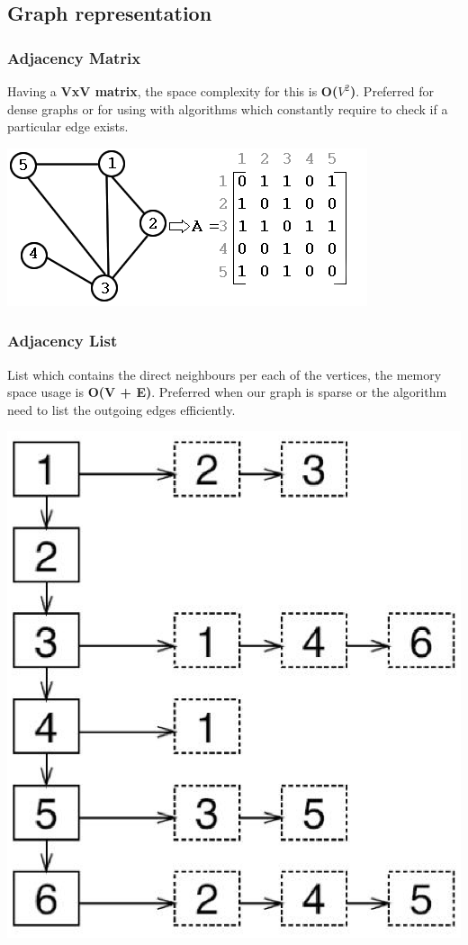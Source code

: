 \documentclass[article]{beamer}
\begin{document}
\subsection{Graph representation}
\begin{frame}
	\frametitle{Adjacency Matrix}
	Having a \textbf{VxV matrix}, the space complexity for this is \textbf{O($V^2$)}. Preferred for dense graphs or for using with algorithms which constantly require to check if a particular edge exists.
	\begin{center}
			\includegraphics[scale=0.6]{./figures/AdjacencyMatrix.png}
	\end{center}
\end{frame}

\begin{frame}
	\frametitle{Adjacency List}
	List which contains the direct neighbours per each of the vertices, the memory space usage is \textbf{O(V + E)}. Preferred when our graph is sparse or the algorithm need to list the outgoing edges efficiently. 
	\begin{center}
			\includegraphics[scale=0.4]{./figures/adjacency_list.eps}
	\end{center}
\end{frame}
\end{document}
